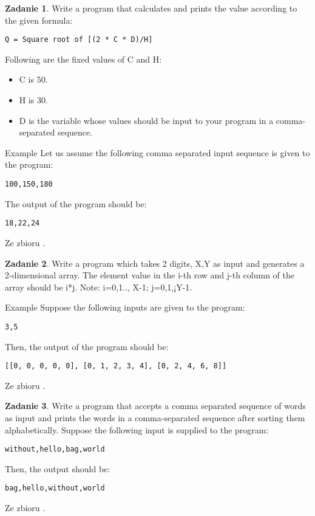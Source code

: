 \documentclass[11pt]{article}
\theoremstyle{definition}
\newtheorem{zadanie}{Zadanie}
\newcommand{\fromA}{\small Ze zbioru \cite{python100}.}
\begin{document}
\begin{zadanie}
Write a program that calculates and prints the value according to the given formula:
\begin{verbatim}
Q = Square root of [(2 * C * D)/H]
\end{verbatim}
Following are the fixed values of C and H:
\begin{itemize}
\item C is 50. 
\item H is 30.
\item D is the variable whose values should be input to your program in a comma-separated sequence.
\end{itemize}
Example
Let us assume the following comma separated input sequence is given to the program:
\begin{verbatim}
100,150,180
\end{verbatim}
The output of the program should be:
\begin{verbatim}
18,22,24
\end{verbatim}

\fromA
\end{zadanie}

\begin{zadanie}
Write a program which takes 2 digits, X,Y as input and generates a 2-dimensional array. The element value in the i-th row and j-th column of the array should be i*j.
Note: i=0,1.., X-1; j=0,1,¡­Y-1.

Example
Suppose the following inputs are given to the program:
\begin{verbatim}
3,5
\end{verbatim}
Then, the output of the program should be:
\begin{verbatim}
[[0, 0, 0, 0, 0], [0, 1, 2, 3, 4], [0, 2, 4, 6, 8]] 
\end{verbatim}

\fromA
\end{zadanie}

\begin{zadanie}
Write a program that accepts a comma separated sequence of words as input and prints the words in a comma-separated sequence after sorting them alphabetically.
Suppose the following input is supplied to the program:
\begin{verbatim}
without,hello,bag,world
\end{verbatim}
Then, the output should be:
\begin{verbatim}
bag,hello,without,world
\end{verbatim}

\fromA
\end{zadanie}
\end{document}
